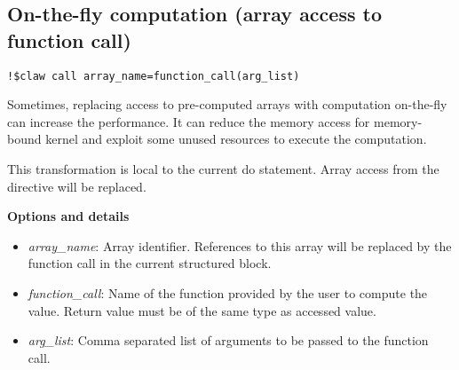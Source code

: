 \subsection{On-the-fly computation (array access to function call)}
\begin{lstlisting}
!$claw call array_name=function_call(arg_list)
\end{lstlisting}

Sometimes, replacing access to pre-computed arrays with computation on-the-fly
can increase the performance. It can reduce the memory access for memory-bound
kernel and exploit some unused resources to execute the computation.

This transformation is local to the current do statement. Array access from the
directive will be replaced.

\textbf{Options and details}
\begin{itemize}
\item \textit{array\_name}: Array identifier. References to this array will be
replaced by the function call in the current structured block.
\item \textit{function\_call}: Name of the function provided by the user to
compute the value. Return value must be of the same type as accessed value.
\item \textit{arg\_list}: Comma separated list of arguments to be passed to
the function call.
\end{itemize}
